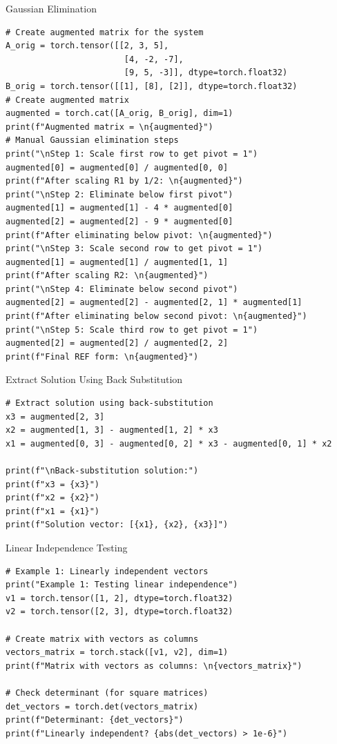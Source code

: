 \documentclass[aspectratio=169,xcolor=dvipsnames,svgnames,x11names,fleqn]{beamer}
\begin{document}
\begin{frame}[containsverbatim]{Gaussian Elimination}
\begin{verbatim}
# Create augmented matrix for the system
A_orig = torch.tensor([[2, 3, 5], 
                        [4, -2, -7], 
                        [9, 5, -3]], dtype=torch.float32)
B_orig = torch.tensor([[1], [8], [2]], dtype=torch.float32)
# Create augmented matrix
augmented = torch.cat([A_orig, B_orig], dim=1)
print(f"Augmented matrix = \n{augmented}")
# Manual Gaussian elimination steps
print("\nStep 1: Scale first row to get pivot = 1")
augmented[0] = augmented[0] / augmented[0, 0]
print(f"After scaling R1 by 1/2: \n{augmented}")
print("\nStep 2: Eliminate below first pivot")
augmented[1] = augmented[1] - 4 * augmented[0]
augmented[2] = augmented[2] - 9 * augmented[0]
print(f"After eliminating below pivot: \n{augmented}")
print("\nStep 3: Scale second row to get pivot = 1")
augmented[1] = augmented[1] / augmented[1, 1]
print(f"After scaling R2: \n{augmented}")
print("\nStep 4: Eliminate below second pivot")
augmented[2] = augmented[2] - augmented[2, 1] * augmented[1]
print(f"After eliminating below second pivot: \n{augmented}")
print("\nStep 5: Scale third row to get pivot = 1")
augmented[2] = augmented[2] / augmented[2, 2]
print(f"Final REF form: \n{augmented}")
\end{verbatim}
\end{frame}



\begin{frame}[containsverbatim]{Extract Solution Using Back Substitution}
\begin{verbatim}
# Extract solution using back-substitution
x3 = augmented[2, 3]
x2 = augmented[1, 3] - augmented[1, 2] * x3
x1 = augmented[0, 3] - augmented[0, 2] * x3 - augmented[0, 1] * x2

print(f"\nBack-substitution solution:")
print(f"x3 = {x3}")
print(f"x2 = {x2}")
print(f"x1 = {x1}")
print(f"Solution vector: [{x1}, {x2}, {x3}]")
\end{verbatim}
\end{frame}



\begin{frame}[containsverbatim]{Linear Independence Testing}
\begin{verbatim}
# Example 1: Linearly independent vectors
print("Example 1: Testing linear independence")
v1 = torch.tensor([1, 2], dtype=torch.float32)
v2 = torch.tensor([2, 3], dtype=torch.float32)

# Create matrix with vectors as columns
vectors_matrix = torch.stack([v1, v2], dim=1)
print(f"Matrix with vectors as columns: \n{vectors_matrix}")

# Check determinant (for square matrices)
det_vectors = torch.det(vectors_matrix)
print(f"Determinant: {det_vectors}")
print(f"Linearly independent? {abs(det_vectors) > 1e-6}")
\end{verbatim}
\end{frame}
\end{document}
